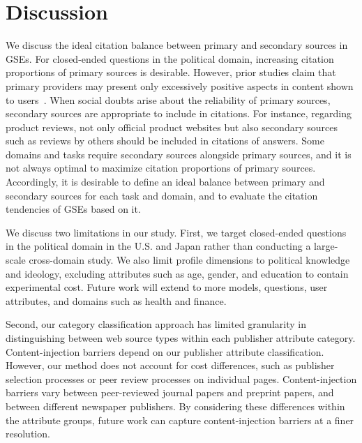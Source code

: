 \section{Discussion}
\label{sec:discussion}
We discuss the ideal citation balance between primary and secondary sources in GSEs.
For closed-ended questions in the political domain, increasing citation proportions of primary sources is desirable.
However, prior studies claim that primary providers may present only excessively positive aspects in content shown to users~\cite{kluver2016setting,leung2015impression,chen2024impression}.
When social doubts arise about the reliability of primary sources, secondary sources are appropriate to include in citations.
For instance, regarding product reviews, not only official product websites but also secondary sources such as reviews by others should be included in citations of answers.
Some domains and tasks require secondary sources alongside primary sources, and it is not always optimal to maximize citation proportions of primary sources.
Accordingly, it is desirable to define an ideal balance between primary and secondary sources for each task and domain, and to evaluate the citation tendencies of GSEs based on it.

We discuss two limitations in our study.
First, we target closed-ended questions in the political domain in the U.S. and Japan rather than conducting a large-scale cross-domain study.
We also limit profile dimensions to political knowledge and ideology, excluding attributes such as age, gender, and education to contain experimental cost.
Future work will extend to more models, questions, user attributes, and domains such as health and finance.

Second, our category classification approach has limited granularity in distinguishing between web source types within each publisher attribute category.
Content-injection barriers depend on our publisher attribute classification.
However, our method does not account for cost differences, such as publisher selection processes or peer review processes on individual pages.
Content-injection barriers vary between peer-reviewed journal papers and preprint papers, and between different newspaper publishers.
By considering these differences within the attribute groups, future work can capture content-injection barriers at a finer resolution.

